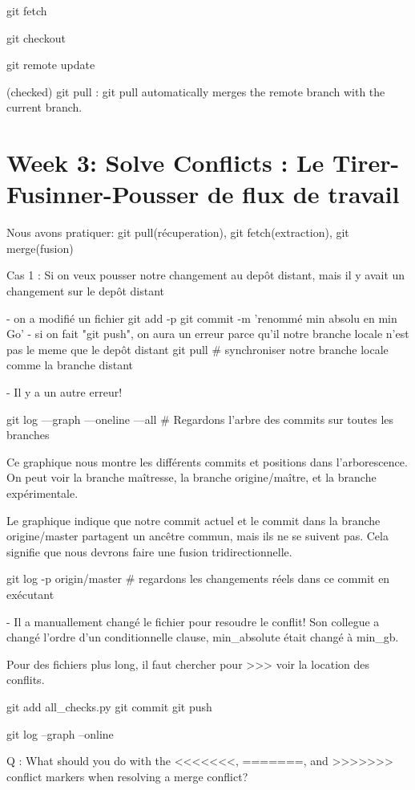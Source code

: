 \documentclass[11pt, onecolumn]{article}
\begin{document}
git fetch

git checkout

git remote update

(checked) git pull  : git pull automatically merges the remote branch with the current branch.


\section{Week 3: Solve Conflicts : Le Tirer-Fusinner-Pousser de flux de travail}

Nous avons pratiquer: git pull(récuperation), git fetch(extraction), git merge(fusion) 

Cas 1 : Si on veux pousser notre changement au depôt distant, mais il y avait un changement sur le depôt distant

- on a modifié un fichier
git add -p
git commit -m 'renommé min absolu en min Go'
- si on fait "git push", on aura un erreur parce qu'il notre branche locale n'est pas le meme que le depôt distant
git pull     # synchroniser notre branche locale comme la branche distant

- Il y a un autre erreur!

git log —graph —oneline —all     # Regardons l'arbre des commits sur toutes les branches

Ce graphique nous montre les différents commits et positions dans l'arborescence. On peut voir la branche maîtresse, la branche origine/maître, et la branche expérimentale.

Le graphique indique que notre commit actuel et le commit dans la branche origine/master
partagent un ancêtre commun, mais ils ne se suivent pas.
Cela signifie que nous devrons faire une fusion tridirectionnelle.

git log -p origin/master     # regardons les changements réels dans ce commit en exécutant 

- Il a manuallement changé le fichier pour resoudre le conflit!  Son collegue a changé l'ordre d'un conditionnelle clause, min_absolute était changé à min_gb.

Pour des fichiers plus long, il faut chercher pour >>> voir la location des conflits.

git add all_checks.py
git commit 
git push

git log --graph --online


Q : What should you do with the <<<<<<<, =======, and >>>>>>> conflict markers when resolving a merge conflict?
\end{document}
